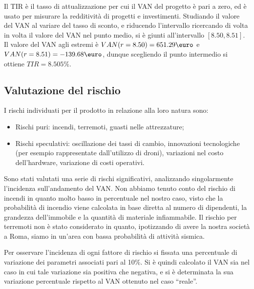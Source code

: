 Il TIR è il tasso di attualizzazione per cui il VAN del progetto è pari a zero, 
ed è usato per misurare la redditività di progetti e investimenti.
Studiando il valore del VAN al variare del tasso di sconto, e riducendo
l’intervallo ricercando di volta in volta il valore del VAN nel punto medio,
si è giunti all’intervallo \mbox{$[8.50, 8.51]$}. Il valore del VAN agli estremi è
$VAN(r = 8.50) = 651.29 \mbox{\euro}$ e $VAN(r=8.51) = -139.68 \mbox{\euro}$,
dunque scegliendo il punto intermedio si ottiene $TIR = 8.505\%$.
\subsection{Valutazione del rischio}
I rischi individuati per il prodotto in relazione alla loro natura sono:
\begin{itemize}
\item Rischi puri: incendi, terremoti, guasti nelle attrezzature;
\item Rischi speculativi: oscillazione dei tassi di cambio, innovazioni
tecnologiche (per esempio rappresentate dall’utilizzo di droni), variazioni nel
costo dell’hardware, variazione di costi operativi.
\end{itemize}

Sono stati valutati una serie di rischi significativi, analizzando singolarmente
l’incidenza sull’andamento del VAN. Non abbiamo tenuto conto del rischio di
incendi in quanto molto basso in percentuale nel nostro caso, visto che la
probabilità di incendio viene calcolata in base diretta al numero di dipendenti,
la grandezza dell’immobile e la quantità di materiale infiammabile. Il rischio
per terremoti non è stato considerato in quanto, ipotizzando di avere la nostra
società a Roma, siamo in un’area con bassa probabilità di attività sismica.

Per osservare l’incidenza di ogni fattore di rischio si fissata una
percentuale di variazione dei parametri associati pari al 10\%. Si è quindi
calcolato il VAN sia nel caso in cui tale variazione sia positiva che negativa,
e si è determinata la sua variazione percentuale rispetto al VAN ottenuto nel
caso “reale”.

